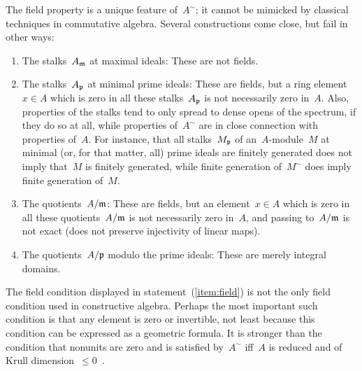 \documentclass{ws-rv9x6}
\begin{document}
{The field property is a unique feature of~$A^\sim$; it cannot be mimicked by
classical techniques in commutative algebra. Several constructions come close,
but fail in other ways:
\begin{enumerate}
\item The stalks~$A_{\mathfrak{m}}$ at maximal ideals: These are not fields.
\item The stalks~$A_{\mathfrak{p}}$ at minimal prime ideals: These are fields, but a ring
element~$x \in A$ which is zero in all these stalks~$A_{\mathfrak{p}}$ is not necessarily
zero in~$A$. Also, properties of the stalks tend to only spread to
dense opens of the spectrum, if they do so at all, while properties of~$A^\sim$
are in close connection with properties of~$A$. For instance, that all
stalks~$M_{\mathfrak{p}}$ of an~$A$-module~$M$ at minimal (or, for that matter, all) prime ideals are finitely
generated does not imply that~$M$ is finitely generated, while finite
generation of~$M^\sim$ does imply finite generation of~$M$.
\item The quotients~$A/\mathfrak{m}$: These are fields, but an element~$x \in A$ which is
zero in all these quotients~$A/\mathfrak{m}$ is not necessarily zero in~$A$, and
passing to~$A/\mathfrak{m}$ is not exact (does not preserve injectivity of linear
maps).
\item The quotients~$A/\mathfrak{p}$ modulo the prime ideals: These are merely integral
domains.
\end{enumerate}

The field condition displayed in statement~(\ref{item:field}) is not the only
field condition used in constructive algebra. Perhaps the most important such
condition is that any element is zero or invertible, not least because this
condition can be expressed as a geometric formula. It is stronger than the
condition that nonunits are zero and is satisfied by~$A^\sim$ iff~$A$ is reduced
and of Krull dimension~$\leq 0$~\cite[Proposition~2.13]{blechschmidt:phd}.

}
\end{document}
